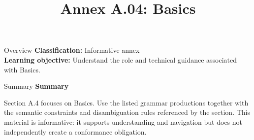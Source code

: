 \documentclass[10pt,letterpaper]{article}
\title{Annex A.04: Basics}
\author{}
\date{}
\begin{document}
\maketitle
\begin{CornellOverviewBox}{Overview}
\textbf{Classification:} Informative annex\\[2pt]
\textbf{Learning objective:} Understand the role and technical guidance associated with Basics.
\end{CornellOverviewBox}\begin{CornellSummaryBox}{Summary}
{\sffamily\bfseries\color{Accent} Summary}\par\vspace{3pt}Section A.4 focuses on Basics. Use the listed grammar productions together with the semantic constraints and disambiguation rules referenced by the section. This material is informative: it supports understanding and navigation but does not independently create a conformance obligation.
\end{CornellSummaryBox}
\end{document}

